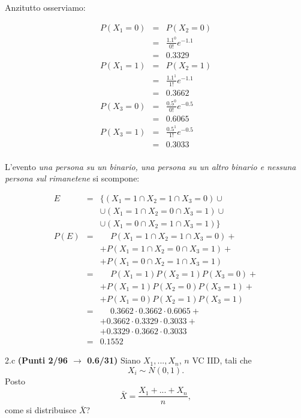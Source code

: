 \documentclass[
  11pt,
]{book}
\theoremstyle{mytheoremstyle}
\theoremstyle{mydefstyle}
\newenvironment{sol}
  {
  \begin{tcolorbox}[enhanced,breakable,arc=0.1mm,boxrule=1pt,colback=white,colframe=iblue,
  title=\bf \fontfamily{lmss}\selectfont \hspace{.5 cm} Soluzione,drop fuzzy shadow]

}{
\end{tcolorbox}
  }
\begin{document}
\begin{sol}
Anzitutto osserviamo:

\begin{eqnarray*}
P(X_1= 0) &=& P(X_2=0)\\
          &=& \frac{1.1^0}{0!}e^{-1.1}\\
          &=& 0.3329\\
P(X_1= 1) &=& P(X_2=1)\\
          &=& \frac{1.1^1}{1!}e^{-1.1}\\
          &=& 0.3662\\
P(X_3= 0) &=& \frac{0.5^0}{0!}e^{-0.5}\\
          &=& 0.6065\\
P(X_3= 1) &=& \frac{0.5^1}{1!}e^{-0.5}\\
          &=& 0.3033\\
\end{eqnarray*}

L'evento \emph{una persona su un binario, una persona su un altro binario e nessuna persona sul rimanetene}
si scompone:

\begin{eqnarray*}
E &=& \big\{(X_1=1\cap X_2=1\cap X_3=0)\cup\\
   &&\cup(X_1=1\cap X_2=0\cap X_3=1)\cup\\
   &&\cup(X_1=0\cap X_2=1\cap X_3=1)\big\}\\
P(E) &=& \phantom{+} P(X_1=1\cap X_2=1\cap X_3=0)+\\
     && + P(X_1=1\cap X_2=0\cap X_3=1)+\\
     && + P(X_1=0\cap X_2=1\cap X_3=1)\\
     &=& \phantom{+} P(X_1=1)P(X_2=1)P(X_3=0)+\\
     && + P(X_1=1)P(X_2=0)P(X_3=1)+\\
     && + P(X_1=0)P(X_2=1)P(X_3=1)\\
     &=& \phantom{+} 0.3662\cdot0.3662\cdot0.6065+\\
     && +0.3662\cdot0.3329\cdot0.3033+\\
     && +0.3329\cdot0.3662\cdot0.3033\\
     &=& 0.1552
\end{eqnarray*}

\end{sol}

2.c \textbf{(Punti 2/96 \(\rightarrow\) 0.6/31)} Siano \(X_1,...,X_n\), \(n\) VC IID, tali che
\[
X_i\sim N(0,1).
\]
Posto
\[
\bar X = \frac{X_1+...+X_n}{n},
\]
come si distribuisce \(\bar X\)?
\end{document}
